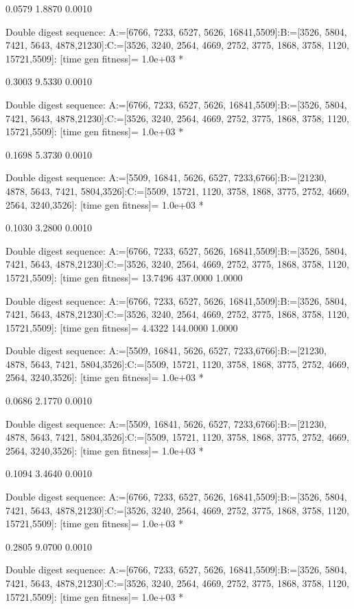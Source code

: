     0.0579    1.8870    0.0010

Double digest sequence:
A:=[6766, 7233, 6527, 5626, 16841,5509]:B:=[3526, 5804, 7421, 5643, 4878,21230]:C:=[3526, 3240, 2564, 4669, 2752, 3775, 1868, 3758, 1120, 15721,5509]:
[time gen fitness]=
   1.0e+03 *

    0.3003    9.5330    0.0010

Double digest sequence:
A:=[6766, 7233, 6527, 5626, 16841,5509]:B:=[3526, 5804, 7421, 5643, 4878,21230]:C:=[3526, 3240, 2564, 4669, 2752, 3775, 1868, 3758, 1120, 15721,5509]:
[time gen fitness]=
   1.0e+03 *

    0.1698    5.3730    0.0010

Double digest sequence:
A:=[5509, 16841, 5626, 6527, 7233,6766]:B:=[21230, 4878, 5643, 7421, 5804,3526]:C:=[5509, 15721, 1120, 3758, 1868, 3775, 2752, 4669, 2564, 3240,3526]:
[time gen fitness]=
   1.0e+03 *

    0.1030    3.2800    0.0010

Double digest sequence:
A:=[6766, 7233, 6527, 5626, 16841,5509]:B:=[3526, 5804, 7421, 5643, 4878,21230]:C:=[3526, 3240, 2564, 4669, 2752, 3775, 1868, 3758, 1120, 15721,5509]:
[time gen fitness]=
   13.7496  437.0000    1.0000

Double digest sequence:
A:=[6766, 7233, 6527, 5626, 16841,5509]:B:=[3526, 5804, 7421, 5643, 4878,21230]:C:=[3526, 3240, 2564, 4669, 2752, 3775, 1868, 3758, 1120, 15721,5509]:
[time gen fitness]=
    4.4322  144.0000    1.0000

Double digest sequence:
A:=[5509, 16841, 5626, 6527, 7233,6766]:B:=[21230, 4878, 5643, 7421, 5804,3526]:C:=[5509, 15721, 1120, 3758, 1868, 3775, 2752, 4669, 2564, 3240,3526]:
[time gen fitness]=
   1.0e+03 *

    0.0686    2.1770    0.0010

Double digest sequence:
A:=[5509, 16841, 5626, 6527, 7233,6766]:B:=[21230, 4878, 5643, 7421, 5804,3526]:C:=[5509, 15721, 1120, 3758, 1868, 3775, 2752, 4669, 2564, 3240,3526]:
[time gen fitness]=
   1.0e+03 *

    0.1094    3.4640    0.0010

Double digest sequence:
A:=[6766, 7233, 6527, 5626, 16841,5509]:B:=[3526, 5804, 7421, 5643, 4878,21230]:C:=[3526, 3240, 2564, 4669, 2752, 3775, 1868, 3758, 1120, 15721,5509]:
[time gen fitness]=
   1.0e+03 *

    0.2805    9.0700    0.0010

Double digest sequence:
A:=[6766, 7233, 6527, 5626, 16841,5509]:B:=[3526, 5804, 7421, 5643, 4878,21230]:C:=[3526, 3240, 2564, 4669, 2752, 3775, 1868, 3758, 1120, 15721,5509]:
[time gen fitness]=
   1.0e+03 *

